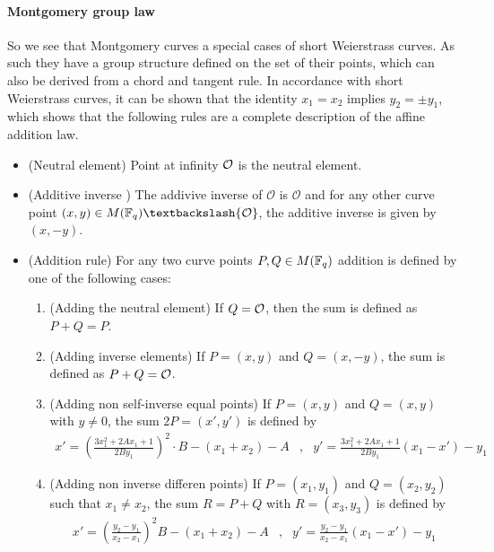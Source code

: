 \paragraph{Montgomery group law} So we see that Montgomery curves a special cases of short Weierstrass curves. As such they have a group structure defined on the set of their points, which can also be derived from a chord and tangent rule. In accordance with short Weierstrass curves, it can be shown that the identity $x_1=x_2$ implies $y_2=\pm y_1$, which shows that the following rules are a complete description of the affine addition law.
\begin{itemize}
\item (Neutral element) Point at infinity $\mathcal{O}$ is the neutral element.
\item (Additive inverse ) The addivive inverse of $\mathcal{O}$ is $\mathcal{O}$ and for any other curve point $(x,y) \in M(\F_q)\textbackslash \{\mathcal{O}\}$, the additive inverse is given by $(x,-y)$.
\item (Addition rule) For any two curve points $P, Q \in M(\mathbb{F}_q)$ addition is defined by one of the following cases:
\begin{enumerate}
\item (Adding the neutral element) If $Q=\mathcal{O}$, then the sum is defined as $P+Q=P$.
\item (Adding inverse elements)  If $P=(x,y)$ and $Q=(x,-y)$, the sum is defined as $P+Q=\mathcal{O}$.
\item (Adding non self-inverse equal points) If $P=(x,y)$ and $Q=(x,y)$ with $y\neq 0$, the sum $2P=(x',y')$ is defined by
$$
\begin{array}{llr}
x' = (\frac{3x_1^2 + 2A x_1 +1}{2By_1})^2\cdot B - (x_1 + x_2) - A &,&
y' = \frac{3x_1^2 + 2A x_1 +1}{2By_1}(x_1-x') - y_1
\end{array}
$$
\item (Adding non inverse differen points) If $P=(x_1,y_1)$ and $Q=(x_2,y_2)$ such that $x_1 \neq x_2$, the sum $R=P+Q$ with $R=(x_3,y_3)$ is defined by
$$
\begin{array}{llr}
x' = (\frac{y_2-y_1}{x_2-x_1})^2B - (x_1 + x_2) - A &, &
y' = \frac{y_2-y_1}{x_2-x_1}(x_1-x') - y_1
\end{array}
$$
\end{enumerate}
\end{itemize}
